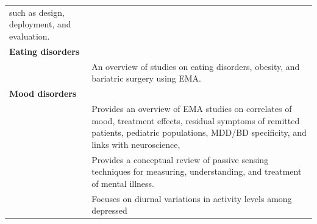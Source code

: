 \documentclass[]{book}
\begin{document}
\begin{longtable}[]{@{}ll@{}}
\begin{minipage}[t]{0.61\columnwidth}
such as design, deployment, and evaluation.\strut
\end{minipage}\tabularnewline
\begin{minipage}[t]{0.33\columnwidth}\raggedright\strut
\textbf{Eating disorders}\strut
\end{minipage} & \begin{minipage}[t]{0.61\columnwidth}\raggedright\strut
\strut
\end{minipage}\tabularnewline
\begin{minipage}[t]{0.33\columnwidth}\raggedright\strut
\citet{Engel2016}\strut
\end{minipage} & \begin{minipage}[t]{0.61\columnwidth}\raggedright\strut
An overview of studies on eating disorders, obesity, and bariatric
surgery using EMA.\strut
\end{minipage}\tabularnewline
\begin{minipage}[t]{0.33\columnwidth}\raggedright\strut
\textbf{Mood disorders}\strut
\end{minipage} & \begin{minipage}[t]{0.61\columnwidth}\raggedright\strut
\strut
\end{minipage}\tabularnewline
\begin{minipage}[t]{0.33\columnwidth}\raggedright\strut
\citet{AanhetRot2012}\strut
\end{minipage} & \begin{minipage}[t]{0.61\columnwidth}\raggedright\strut
Provides an overview of EMA studies on correlates of mood, treatment
effects, residual symptoms of remitted patients, pediatric populations,
MDD/BD specificity, and links with neuroscience,\strut
\end{minipage}\tabularnewline
\begin{minipage}[t]{0.33\columnwidth}\raggedright\strut
\citet{Aung2017}\strut
\end{minipage} & \begin{minipage}[t]{0.61\columnwidth}\raggedright\strut
Provides a conceptual review of passive sensing techniques for
measuring, understanding, and treatment of mental illness.\strut
\end{minipage}\tabularnewline
\begin{minipage}[t]{0.33\columnwidth}\raggedright\strut
\citet{burton2013}\strut
\end{minipage} & \begin{minipage}[t]{0.61\columnwidth}\raggedright\strut
Focuses on diurnal variations in activity levels among depressed

\end{minipage}
\end{longtable}
\end{document}
